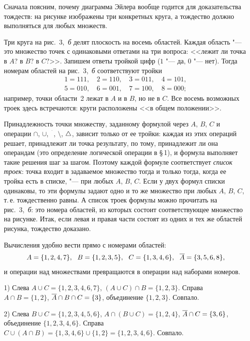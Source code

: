 \begin{solution}[1 (\S\,2)]
Сначала поясним, почему диаграмма Эйлера вообще годится для доказательства
тождеств: на рисунке изображены три конкретных круга, а тождество должно
выполняться для любых множеств.

Три круга на рис.~3,~\emph{б} делят плоскость на восемь областей. Каждая
область "--- это множество точек с одинаковыми ответами на три вопроса:
<<лежит ли точка в $A$? в $B$? в $C$?>>. Запишем ответы тройкой цифр
($1$ "--- да, $0$ "--- нет). Тогда номерам областей на рис.~3,~\emph{б}
соответствуют тройки
\[
\begin{gathered}
1=111,\quad 2=110,\quad 3=011,\quad 4=101,\\
5=010,\quad 6=001,\quad 7=100,\quad 8=000;
\end{gathered}
\]
например, точки области~2 лежат в $A$ и в $B$, но не в $C$. Все восемь
возможных троек здесь встречаются: круги расположены <<в общем
положении>>.

Принадлежность точки множеству, заданному формулой через $A$, $B$, $C$
и операции $\cap$, $\cup$, ${}^{\overline{\phantom{a}}}$, $\setminus$, $\mathbin{\triangle}$,
зависит только от ее тройки: каждая из этих операций решает, принадлежит
ли точка результату, по тому, принадлежит ли она операндам (это
определение логической операции в \S\,1), и формула выполняет такие
решения шаг за шагом. Поэтому каждой формуле соответствует \emph{список
троек}: точка входит в задаваемое множество тогда и только тогда, когда ее
тройка есть в списке, "--- при любых $A$, $B$, $C$. Если у двух формул
списки одинаковы, то эти формулы задают одно и то же множество при любых
$A$, $B$, $C$, т.\,е. тождественно равны. А список троек формулы можно
прочитать на рис.~3,~\emph{б}: это номера областей, из которых состоит
соответствующее множество на рисунке. Итак, если левая и правая части
состоят из одних и тех же областей рисунка, тождество доказано.

Вычисления удобно вести прямо с номерами областей:
\[
A=\{1,2,4,7\},\ \ B=\{1,2,3,5\},\ \ C=\{1,3,4,6\},\ \
\ov A=\{3,5,6,8\},
\]
и операции над множествами превращаются в операции над наборами номеров.

1) Слева $A\cup C=\{1,2,3,4,6,7\}$, $(A\cup C)\cap B=\{1,2,3\}$. Справа
$A\cap B=\{1,2\}$, $\overline{A}\cap B\cap C=\{3\}$, объединение $\{1,2,3\}$.
Совпало.

2) Слева $B\cup C=\{1,2,3,4,5,6\}$, $A\cap(B\cup C)=\{1,2,4\}$,
$\overline{A}\cap C=\{3,6\}$, объединение $\{1,2,3,4,6\}$. Справа
$C\cup(A\cap B)=\{1,3,4,6\}\cup\{1,2\}=\{1,2,3,4,6\}$. Совпало.


\end{solution}
